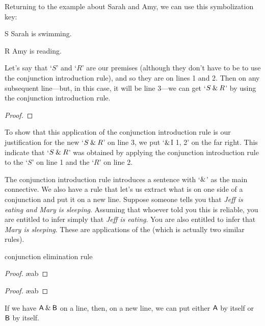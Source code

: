 Returning to the example about Sarah and Amy, we can use this symbolization key:
	\begin{ekey}
		\item[S] Sarah is swimming.
		\item[R] Amy is reading.
	\end{ekey}
Let's say that `$S$' and `$R$' are our premises (although they don't have to be to use the conjunction introduction rule), and so they are on lines 1 and 2. Then on any subsequent line---but, in this case, it will be line 3---we can get `$S \mathbin{\&} R$' by using the conjunction introduction rule.
\begin{proof}
	 \pr{}
	 \pr{}
	 
\end{proof}
To show that this application of the conjunction introduction rule is our justification for the new `$S \mathbin{\&} R$' on line 3, we put `$\mathbin{\&}$I 1, 2' on the far right. This indicate that `$S \mathbin{\&} R$' was obtained by applying the conjunction introduction rule to the `$S$' on line 1 and the `$R$' on line 2. 

The conjunction introduction rule introduces a sentence with `$\mathbin{\&}$' as the main connective. We also have a rule that let's us extract what is on one side of a conjunction and put it on a new line. Suppose someone tells you that \textit{Jeff is eating and Mary is sleeping}. Assuming that whoever told you this is reliable, you are entitled to infer simply that \textit{Jeff is eating}. You are also entitled to infer that \textit{Mary is sleeping}. These are applications of the  (which is actually two similar rules).

\begin{factboxy}{conjunction elimination rule}
\begin{proof}
	 \ae{ab}
\end{proof}

\begin{proof}
	 \ae{ab}
\end{proof}

\small{If we have $\mathsf{A} \mathbin{\&} \mathsf{B}$ on a line, then, on a new line, we can put either $\mathsf{A}$ by itself or $\mathsf{B}$ by itself.}

\end{factboxy}

